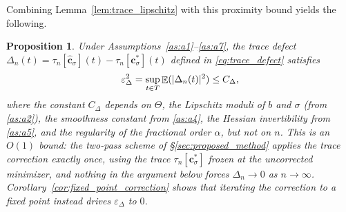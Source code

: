 \documentclass[11pt, a4paper]{article}
\theoremstyle{theoremstyle}
\newtheorem{proposition}[theorem]{Proposition}
\theoremstyle{definitionstyle}
\DeclareMathOperator{\EE}{\mathbb E}
\DeclarePairedDelimiter{\abs}{\lvert}{\rvert}
\begin{document}
Combining Lemma~\ref{lem:trace_lipschitz} with this proximity bound yields the following.

\begin{proposition}\label{prop:trace_defect_bound}
    Under Assumptions~\ref{as:a1}--\ref{as:a7}, the trace defect $\Delta_n(t) = \tau_n[\hat{\mathbf c}_\sigma](t) - \tau_n[\mathbf c^*_\sigma](t)$ defined in \eqref{eq:trace_defect} satisfies
    \begin{equation}\label{eq:Delta_bound}
        \varepsilon^2_\Delta = \sup_{t \in T} \EE(\abs{\Delta_n(t)}^2) \leq C_\Delta,
    \end{equation}
    where the constant $C_\Delta$ depends on $\Theta$, the Lipschitz moduli of $b$ and $\sigma$ (from \ref{as:a2}), the smoothness constant from \ref{as:a4}, the Hessian invertibility from \ref{as:a5}, and the regularity of the fractional order $\alpha$, but \emph{not} on $n$. This is an $O(1)$ bound: the two-pass scheme of \S\ref{sec:proposed_method} applies the trace correction exactly once, using the trace $\tau_n[\mathbf c^*_\sigma]$ frozen at the uncorrected minimizer, and nothing in the argument below forces $\Delta_n \to 0$ as $n \to \infty$. Corollary~\ref{cor:fixed_point_correction} shows that iterating the correction to a fixed point instead drives $\varepsilon_\Delta$ to $0$.
\end{proposition}
\end{document}
